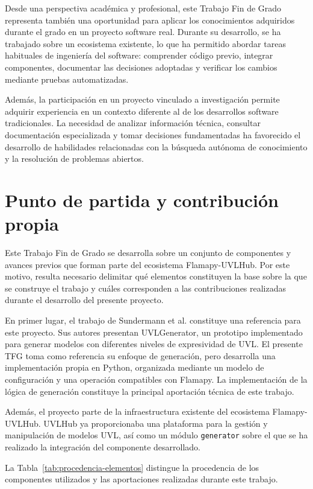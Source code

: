Desde una perspectiva académica y profesional, este Trabajo Fin de Grado representa también una oportunidad para aplicar los conocimientos adquiridos durante el grado en un proyecto software real. Durante su desarrollo, se ha trabajado sobre un ecosistema existente, lo
que ha permitido abordar tareas habituales de ingeniería del software:
comprender código previo, integrar componentes, documentar las decisiones
adoptadas y verificar los cambios mediante pruebas automatizadas.

Además, la participación en un proyecto vinculado a investigación permite adquirir experiencia en un contexto diferente al de los desarrollos software tradicionales. La necesidad de analizar información técnica, consultar documentación especializada y tomar decisiones fundamentadas ha favorecido el desarrollo de habilidades relacionadas con la búsqueda autónoma de conocimiento y la resolución de problemas abiertos.


\section{Punto de partida y contribución propia}
\label{sec:punto_partida}

Este Trabajo Fin de Grado se desarrolla sobre un conjunto de componentes y avances
previos que forman parte del ecosistema Flamapy-UVLHub. Por este motivo, resulta
necesario delimitar qué elementos constituyen la base sobre la que se construye el
trabajo y cuáles corresponden a las contribuciones realizadas durante el desarrollo
del presente proyecto.

En primer lugar, el trabajo de Sundermann et al.
\cite{sundermann2024generating} constituye una referencia para este proyecto.
Sus autores presentan UVLGenerator, un prototipo implementado para generar
modelos con diferentes niveles de expresividad de UVL. El presente TFG toma
como referencia su enfoque de generación, pero desarrolla una implementación
propia en Python, organizada mediante un modelo de configuración y una
operación compatibles con Flamapy. La implementación de la lógica de
generación constituye la principal aportación técnica de este trabajo.

Además, el proyecto parte de la infraestructura existente del ecosistema
Flamapy-UVLHub. UVLHub ya proporcionaba una plataforma para la gestión y
manipulación de modelos UVL, así como un módulo \texttt{generator} sobre el
que se ha realizado la integración del componente desarrollado.

La Tabla~\ref{tab:procedencia-elementos} distingue la procedencia de los
componentes utilizados y las aportaciones realizadas durante este trabajo.

